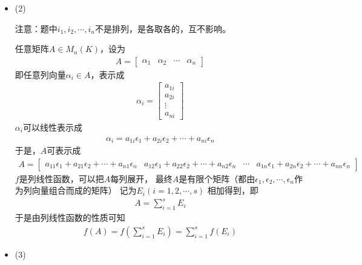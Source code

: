 \documentclass{article}
\begin{document}
\begin{itemize}
\begin{itemize}
          \item 负元素。

                任意$f \in P(K)$，其负元素为$-f$。

                对任意$A \in M_n(K)$，有
                \begin{align*}
                  (f + (- f))(A) = f(A) + (- f(A)) = 0
                \end{align*}
                所以$f + (- f)$是零元素。
        \end{itemize}
        其他法则证明略。

  \item (2)

        注意：题中$i_1, i_2, \cdots, i_n$不是排列，是各取各的，互不影响。

        任意矩阵$A \in M_n(K)$，设为
        \begin{align*}
          A = \begin{bmatrix}
                \alpha_1 & \alpha_2 & \cdots & \alpha_n
              \end{bmatrix}
        \end{align*}
        即任意列向量$\alpha_i \in A$，表示成
        \begin{align*}
          \alpha_i = \begin{bmatrix}
                       a_{1i} \\
                       a_{2i} \\
                       \vdots \\
                       a_{ni}
                     \end{bmatrix}
        \end{align*}
        $\alpha_i$可以线性表示成
        \begin{align*}
          \alpha_i = a_{1i} \epsilon_1 + a_{2i} \epsilon_2 + \cdots + a_{ni} \epsilon_n
        \end{align*}
        于是，$A$可表示成
        \begin{align*}
          A = \begin{bmatrix}
                a_{11} \epsilon_1 + a_{21} \epsilon_2 + \cdots + a_{n1} \epsilon_n &
                a_{12} \epsilon_1 + a_{22} \epsilon_2 + \cdots + a_{n2} \epsilon_n &
                \cdots                                                             &
                a_{1n} \epsilon_1 + a_{2n} \epsilon_2 + \cdots + a_{nn} \epsilon_n
              \end{bmatrix}
        \end{align*}
        $f$是列线性函数，可以把$A$每列展开，
        最终$A$是有限个矩阵（都由$\epsilon_1, \epsilon_2, \cdots, \epsilon_n$作为列向量组合而成的矩阵）
        记为$E_i(i = 1, 2, \cdots, s)$
        相加得到，即
        \begin{align*}
          A = \sum_{i = 1}^s E_i
        \end{align*}
        于是由列线性函数的性质可知
        \begin{align*}
          f(A) = f(\sum_{i = 1}^s E_i) = \sum_{i = 1}^s f(E_i)
        \end{align*}
  \item (3)


\end{itemize}
\end{document}
